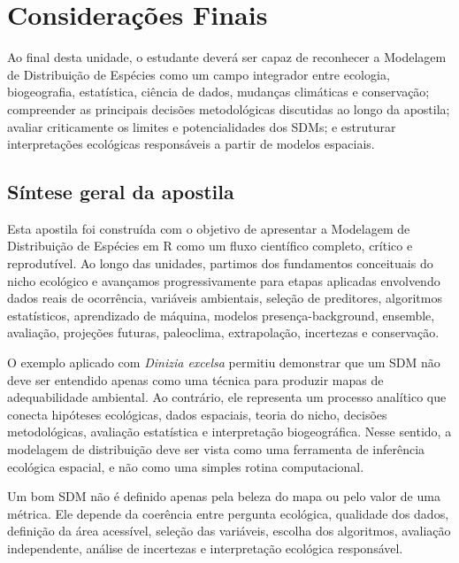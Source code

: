 \chapter[Considerações finais]{Considerações Finais}

\begin{objetivos}
	Ao final desta unidade, o estudante deverá ser capaz de reconhecer a Modelagem de Distribuição de Espécies como um campo integrador entre ecologia, biogeografia, estatística, ciência de dados, mudanças climáticas e conservação; compreender as principais decisões metodológicas discutidas ao longo da apostila; avaliar criticamente os limites e potencialidades dos SDMs; e estruturar interpretações ecológicas responsáveis a partir de modelos espaciais.
\end{objetivos}

\section{Síntese geral da apostila}

Esta apostila foi construída com o objetivo de apresentar a Modelagem de Distribuição de Espécies em R como um fluxo científico completo, crítico e reprodutível. Ao longo das unidades, partimos dos fundamentos conceituais do nicho ecológico e avançamos progressivamente para etapas aplicadas envolvendo dados reais de ocorrência, variáveis ambientais, seleção de preditores, algoritmos estatísticos, aprendizado de máquina, modelos presença-background, ensemble, avaliação, projeções futuras, paleoclima, extrapolação, incertezas e conservação.

O exemplo aplicado com \textit{Dinizia excelsa} permitiu demonstrar que um SDM não deve ser entendido apenas como uma técnica para produzir mapas de adequabilidade ambiental. Ao contrário, ele representa um processo analítico que conecta hipóteses ecológicas, dados espaciais, teoria do nicho, decisões metodológicas, avaliação estatística e interpretação biogeográfica. Nesse sentido, a modelagem de distribuição deve ser vista como uma ferramenta de inferência ecológica espacial, e não como uma simples rotina computacional.

\begin{conceito}[title={\faBook\quad Mensagem central da apostila}]
	Um bom SDM não é definido apenas pela beleza do mapa ou pelo valor de uma métrica. Ele depende da coerência entre pergunta ecológica, qualidade dos dados, definição da área acessível, seleção das variáveis, escolha dos algoritmos, avaliação independente, análise de incertezas e interpretação ecológica responsável.
\end{conceito}

